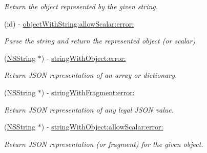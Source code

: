 \begin{DoxyCompactItemize}
\begin{DoxyCompactList}\small\item\em \-Return the object represented by the given string. \end{DoxyCompactList}\item 
\hypertarget{interface_s_b_j_s_o_n_a942831fa293980ad189b72860055d32a}{
(id) -\/ \hyperlink{interface_s_b_j_s_o_n_a942831fa293980ad189b72860055d32a}{object\-With\-String\-:allow\-Scalar\-:error\-:}}
\label{interface_s_b_j_s_o_n_a942831fa293980ad189b72860055d32a}

\begin{DoxyCompactList}\small\item\em \-Parse the string and return the represented object (or scalar) \end{DoxyCompactList}\item 
\hypertarget{interface_s_b_j_s_o_n_a3687db463abee044cb06e0924142deb8}{
(\hyperlink{class_n_s_string}{\-N\-S\-String} $\ast$) -\/ \hyperlink{interface_s_b_j_s_o_n_a3687db463abee044cb06e0924142deb8}{string\-With\-Object\-:error\-:}}
\label{interface_s_b_j_s_o_n_a3687db463abee044cb06e0924142deb8}

\begin{DoxyCompactList}\small\item\em \-Return \-J\-S\-O\-N representation of an array or dictionary. \end{DoxyCompactList}\item 
\hypertarget{interface_s_b_j_s_o_n_a006d605894edce824a18ec157ec28a3e}{
(\hyperlink{class_n_s_string}{\-N\-S\-String} $\ast$) -\/ \hyperlink{interface_s_b_j_s_o_n_a006d605894edce824a18ec157ec28a3e}{string\-With\-Fragment\-:error\-:}}
\label{interface_s_b_j_s_o_n_a006d605894edce824a18ec157ec28a3e}

\begin{DoxyCompactList}\small\item\em \-Return \-J\-S\-O\-N representation of any legal \-J\-S\-O\-N value. \end{DoxyCompactList}\item 
\hypertarget{interface_s_b_j_s_o_n_a1daa6e2cb4bac21afe6c884ece6dc4ad}{
(\hyperlink{class_n_s_string}{\-N\-S\-String} $\ast$) -\/ \hyperlink{interface_s_b_j_s_o_n_a1daa6e2cb4bac21afe6c884ece6dc4ad}{string\-With\-Object\-:allow\-Scalar\-:error\-:}}
\label{interface_s_b_j_s_o_n_a1daa6e2cb4bac21afe6c884ece6dc4ad}

\begin{DoxyCompactList}\small\item\em \-Return \-J\-S\-O\-N representation (or fragment) for the given object. \end{DoxyCompactList}\end{DoxyCompactItemize}


